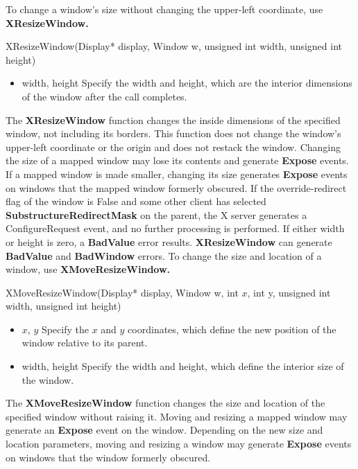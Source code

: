 \documentclass{report}
\begin{document}
\begin{itemize}
            \bigbreak \noindent 
            To change a window’s size without changing the upper-left coordinate, use \textbf{XResizeWindow.}
            \bigbreak \noindent 
            \begin{cppcode}
                XResizeWindow(Display* display, Window w, unsigned int width, unsigned int height)
            \end{cppcode}
            \bigbreak \noindent
            \begin{itemize}
                \item width, height Specify the width and height, which are the interior dimensions of the window after the call completes.
            \end{itemize}
            The \textbf{XResizeWindow} function changes the inside dimensions of the specified window, not including its borders. This function does not change the window’s upper-left coordinate or the origin and does not restack the window. Changing the size of a mapped window may lose its contents and generate \textbf{Expose} events. If a mapped window is made smaller, changing its size generates \textbf{Expose} events on windows that the mapped window formerly obscured.
            \bigbreak \noindent 
            If the override-redirect flag of the window is False and some other client has selected \textbf{SubstructureRedirectMask} on the parent, the X server generates a ConfigureRequest event, and no further processing is performed. If either width or height is zero, a \textbf{BadValue} error results.
            \textbf{XResizeWindow} can generate \textbf{BadValue} and \textbf{BadWindow} errors.
            \bigbreak \noindent 
            To change the size and location of a window, use \textbf{XMoveResizeWindow.}
            \bigbreak \noindent 
            \begin{cppcode}
                XMoveResizeWindow(Display* display, Window w, int $x$, int y, unsigned int width, unsigned int height)
            \end{cppcode}
            \bigbreak \noindent
            \begin{itemize}
                \item $x$, $y$ Specify the $x$ and $y$ coordinates, which define the new position of the window relative to its parent.
                \item width, height Specify the width and height, which define the interior size of the window.
            \end{itemize}
            The \textbf{XMoveResizeWindow} function changes the size and location of the specified window without raising it. Moving and resizing a mapped window may generate an \textbf{Expose} event on the window. Depending on the new size and location parameters, moving and resizing a window may generate \textbf{Expose} events on windows that the window formerly obscured.

\end{itemize}
\end{document}
